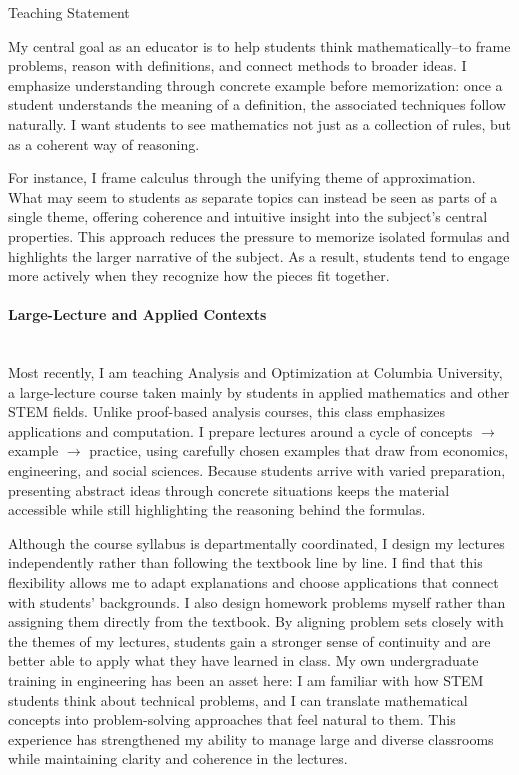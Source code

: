 \documentclass[11pt]{article}
\begin{document}
\begin{center}
\Large{Teaching Statement}
\end{center}

My central goal as an educator is to help students think mathematically--to frame problems, reason with definitions, and connect methods to broader ideas.
I emphasize understanding through concrete example before memorization: once a student understands the meaning of a definition, the associated techniques follow naturally.
I want students to see mathematics not just as a collection of rules, but as a coherent way of reasoning.

For instance, I frame calculus through the unifying theme of approximation. 
What may seem to students as separate topics can instead be seen as parts of a single theme, offering coherence and intuitive insight into the subject’s central properties.
This approach reduces the pressure to memorize isolated formulas and highlights the larger narrative of the subject. 
As a result, students tend to engage more actively when they recognize how the pieces fit together.

\paragraph{Large-Lecture and Applied Contexts}\quad \\
Most recently, I am teaching Analysis and Optimization at Columbia University, a large-lecture course taken mainly by students in applied mathematics and other STEM fields.
Unlike proof-based analysis courses, this class emphasizes applications and computation.
I prepare lectures around a cycle of concepts $\to$ example $\to$ practice, using carefully chosen examples that draw from economics, engineering, and social sciences.
Because students arrive with varied preparation, presenting abstract ideas through concrete situations keeps the material accessible while still highlighting the reasoning behind the formulas.

Although the course syllabus is departmentally coordinated, I design my lectures independently rather than following the textbook line by line.
I find that this flexibility allows me to adapt explanations and choose applications that connect with students' backgrounds.
I also design homework problems myself rather than assigning them directly from the textbook.
By aligning problem sets closely with the themes of my lectures, students gain a stronger sense of continuity and are better able to apply what they have learned in class.
My own undergraduate training in engineering has been an asset here: I am familiar with how STEM students think about technical problems, and I can translate mathematical concepts into problem-solving approaches that feel natural to them.
This experience has strengthened my ability to manage large and diverse classrooms while maintaining clarity and coherence in the lectures.
\end{document}
